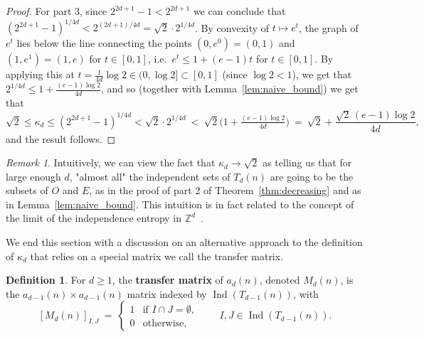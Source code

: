 \documentclass{article}
\theoremstyle{plain}
\theoremstyle{definition}
\newtheorem{definition}[theorem]{Definition}
\theoremstyle{remark}
\newtheorem{remark}[theorem]{Remark}
\DeclareMathOperator{\Ind}{Ind}
\begin{document}
\begin{proof}
For part 3, since $2^{2d+1}-1<2^{2d+1}$ we can conclude that $(2^{2d+1}-1)^{1/4d}<2^{(2d+1)/4d}=\sqrt2\cdot2^{1/4d}$. By convexity of $t\mapsto e^t$, the graph of $e^t$ lies below the line connecting the points $(0,e^0)=(0,1)$ and $(1,e^1)=(1,e)$ for $t\in[0,1]$, i.e.\ $e^t\le1+(e-1)t$ for $t\in[0,1]$. By applying this at $t=\tfrac1{4d} \log2\in(0,\log2]\subset[0,1]$ (since $\log2<1$), we get that  $2^{1/4d}\le1+\tfrac{(e-1)\log2}{4d}$, and so (together with Lemma~\ref{lem:naive_bound}) we get that 
\[
\sqrt{2} \leq \kappa_d \leq (2^{2d+1}-1)^{1/4d}< \sqrt2\cdot2^{1/4d} \ <\ \sqrt2\Big(1+\tfrac{(e-1)\log2}{4d}\Big)\ =\ \sqrt2+\frac{\sqrt2\,(e-1)\log2}{4d},
\]
and the result follows.  %
\end{proof}

\begin{remark}
    Intuitively, we can view the fact that $\kappa_d \to \sqrt{2}$  as telling us that for large enough $d$, "almost all" the independent sets of $T_d(n)$ are going to be the subsets of $O$ and $E$, as in the proof of part 2 of Theorem~\ref{thm:decreasing} and as in Lemma~\ref{lem:naive_bound}. This intuition is in fact related to the concept of the limit of the independence entropy in $\mathbb{Z}^d$~\cite{louidor2013independence, korshunov1983number, ordentlich2004independent}. 
\end{remark}

We end this section with a discussion on an alternative approach to the definition of $\kappa_d$ that relies on a special matrix we call the transfer matrix. 

\begin{definition}\label{def:transfer}
For $d\ge1$, the \textbf{transfer matrix} of $a_d(n)$, denoted $M_d(n)$, is the $a_{d-1}(n)\times a_{d-1}(n)$ matrix indexed by $\Ind(T_{d-1}(n))$, with
\[
[M_d(n)]_{I,J}\ =\ \begin{cases}1&\text{if }I\cap J=\emptyset,\\0&\text{otherwise,}\end{cases}\qquad I,J\in\Ind(T_{d-1}(n)).
\]
\end{definition}
\end{document}
